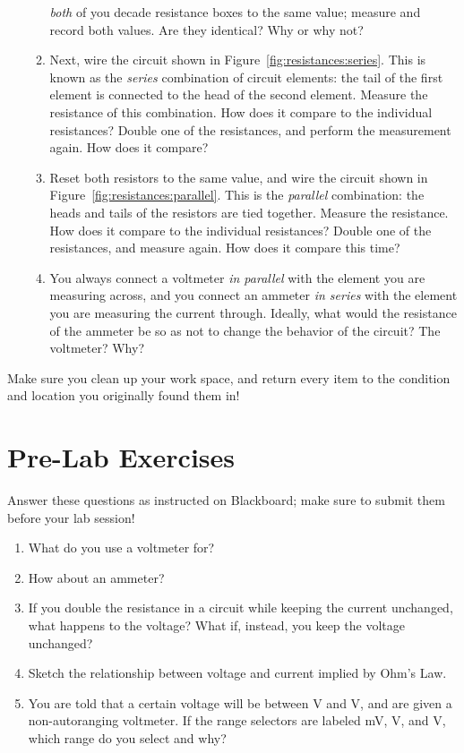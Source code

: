 \documentclass[12pt]{article}
\begin{document}
\begin{enumerate}
\begin{enumerate}
    \textit{both} of you decade resistance boxes to the same value;
    measure and record both values.  Are they identical?  Why or why
    not? 
  \item \label{item:series} Next, wire the circuit shown in
    Figure~\ref{fig:resistances:series}.  This is known as the
    \textit{series} combination of circuit elements: the tail of the
    first element is connected to the head of the second element.
    Measure the resistance of this combination.  How does it compare
    to the individual resistances?  Double one of the resistances, and
    perform the measurement again.  How does it compare?
  \item \label{item:parallel} Reset both resistors to the same value,
    and wire the circuit shown in
    Figure~\ref{fig:resistances:parallel}.  This is the
    \textit{parallel} combination: the heads and tails of the
    resistors are tied together.  Measure the resistance.  How does it
    compare to the individual resistances?  Double one of the
    resistances, and measure again.  How does it compare this time?
  \item You always connect a voltmeter \textit{in parallel} with the
    element you are measuring across, and you connect an ammeter
    \textit{in series} with the element you are measuring the current
    through.  Ideally, what would the resistance of the ammeter be so
    as not to change the behavior of the circuit?  The voltmeter?
    Why? 
  \end{enumerate}
\end{enumerate}

Make sure you clean up your work space, and return every item to the
condition and location you originally found them in!

\newpage

\section*{Pre-Lab Exercises}

Answer these questions as instructed on Blackboard; make sure to
submit them before your lab session!

\begin{enumerate}
\item What do you use a voltmeter for?
\item How about an ammeter?
\item If you double the resistance in a circuit while keeping the
  current unchanged, what happens to the voltage?  What if, instead,
  you keep the voltage unchanged?
\item Sketch the relationship between voltage and current implied by
  Ohm's Law.
\item You are told that a certain voltage will be between \unit[3]{V}
  and \unit[5]{V}, and are given a non-autoranging voltmeter.  If the
  range selectors are labeled \unit[200]{mV}, \unit[2]{V}, and
  \unit[20]{V}, which range do you select and why?
\end{enumerate}
\end{document}
